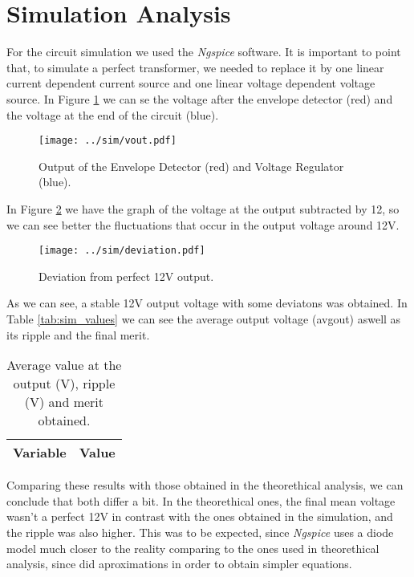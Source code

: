 \section{Simulation Analysis}
\label{sec:simulation}

For the circuit simulation we used the \textit{Ngspice} software. It is important to point that, to simulate a perfect transformer, we needed to replace it by one linear current dependent current source and one linear voltage dependent voltage source. In Figure \ref{fig:sim_output} we can se the voltage after the envelope detector (red) and the voltage at the end of the circuit (blue).

\begin{figure}[H] \centering
\texttt{[image: ../sim/vout.pdf]}
\caption{Output of the Envelope Detector (red) and Voltage Regulator (blue).}
\label{fig:sim_output}
\end{figure}

In Figure \ref{fig:sim_deviation} we have the graph of the voltage at the output subtracted by 12, so we can see better the fluctuations that occur in the output voltage around 12V.

\begin{figure}[H] \centering
\texttt{[image: ../sim/deviation.pdf]}
\caption{Deviation from perfect 12V output.}
\label{fig:sim_deviation}
\end{figure}

As we can see, a stable 12V output voltage with some deviatons was obtained. In Table \ref{tab:sim_values} we can see the average output voltage (avgout) aswell as its ripple and the final merit.

\begin{table}[H]
  \centering
  \begin{tabular}{|l|r|}
    \hline    
    {\bf Variable} & {\bf Value} \\ \hline
    
  \end{tabular}
  \caption{Average value at the output (V), ripple (V) and merit obtained.}
  \label{tab:sim1}
\end{table}

Comparing these results with those obtained in the theorethical analysis, we can conclude that both differ a bit. In the theorethical ones, the final mean voltage wasn't a perfect 12V in contrast with the ones obtained in the simulation, and the ripple was also higher. This was to be expected, since \textit{Ngspice} uses a diode model much closer to the reality comparing to the ones used in theorethical analysis, since did aproximations in order to obtain simpler equations.






